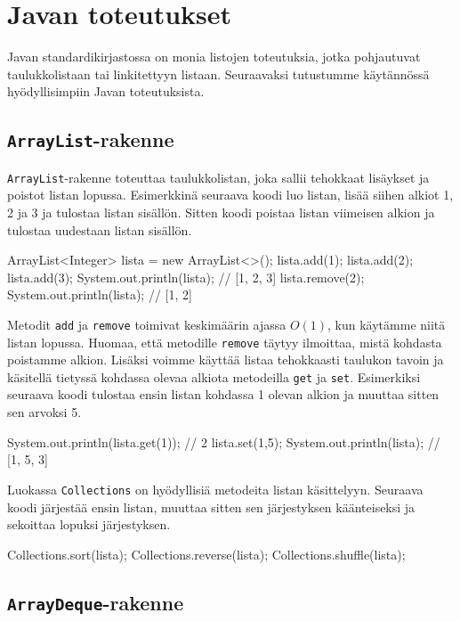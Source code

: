 \section{Javan toteutukset}

Javan standardikirjastossa on monia listojen toteutuksia,
jotka pohjautuvat taulukkolistaan tai linkitettyyn listaan.
Seuraavaksi tutustumme käytännössä hyödyllisimpiin
Javan toteutuksista.

\subsection{\texttt{ArrayList}-rakenne}

\texttt{ArrayList}-rakenne toteuttaa taulukkolistan,
joka sallii tehokkaat lisäykset ja poistot listan lopussa.
Esimerkkinä seuraava koodi luo listan, lisää siihen alkiot
1, 2 ja 3 ja tulostaa listan sisällön.
Sitten koodi poistaa listan viimeisen alkion ja
tulostaa uudestaan listan sisällön.

\begin{code}
ArrayList<Integer> lista = new ArrayList<>();
lista.add(1);
lista.add(2);
lista.add(3);
System.out.println(lista); // [1, 2, 3]
lista.remove(2);
System.out.println(lista); // [1, 2]
\end{code}

Metodit \texttt{add} ja \texttt{remove}
toimivat keskimäärin ajassa $O(1)$,
kun käytämme niitä listan lopussa.
Huomaa, että metodille \texttt{remove} täytyy ilmoittaa,
mistä kohdasta poistamme alkion.
Lisäksi voimme käyttää listaa tehokkaasti taulukon tavoin
ja käsitellä tietyssä kohdassa olevaa alkiota
metodeilla \texttt{get} ja \texttt{set}.
Esimerkiksi seuraava koodi tulostaa ensin
listan kohdassa 1 olevan alkion ja muuttaa sitten
sen arvoksi 5.

\begin{code}
System.out.println(lista.get(1)); // 2
lista.set(1,5);
System.out.println(lista); // [1, 5, 3]
\end{code}

Luokassa \texttt{Collections} on hyödyllisiä metodeita
listan käsittelyyn.
Seuraava koodi järjestää ensin listan,
muuttaa sitten sen järjestyksen käänteiseksi
ja sekoittaa lopuksi järjestyksen.

\begin{code}
Collections.sort(lista);
Collections.reverse(lista);
Collections.shuffle(lista);
\end{code}

\subsection{\texttt{ArrayDeque}-rakenne}

